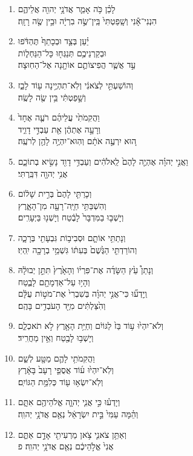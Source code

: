 \documentclass[12pt,a4paper,titlepage]{article}
\def \pscolor{red} %
\def \pslabelsep{-0.65em} %
\def \psleftmargin{0em} %
\begin{document}
\begin{hebrew}
\begin{enumerate}[leftmargin=\psleftmargin, labelsep=\pslabelsep, label=\fontspec{Linux Libertine}\arabic*, font=\color{\pscolor}\small\textsuperscript, parsep=0em, itemsep=0em, topsep=0em]
            \item לָכֵ֗ן כֹּ֥ה אָמַ֛ר אֲדֹנָ֥י יְהוִ֖ה אֲלֵיהֶ֑ם \\ הִנְנִי־אָ֕נִי וְשָֽׁפַטְתִּי֙ בֵּֽין־שֶׂ֣ה בִרְיָ֔ה וּבֵ֥ין שֶׂ֖ה רָזָֽה׃
            \item יַ֗עַן בְּצַ֤ד וּבְכָתֵף֙ תֶּהְדֹּ֔פוּ \\ וּבְקַרְנֵיכֶ֥ם תְּנַגְּח֖וּ כָּל־הַנַּחְל֑וֹת \\ עַ֣ד אֲשֶׁ֧ר הֲפִיצוֹתֶ֛ם אוֹתָ֖נָה אֶל־הַחֽוּצָה׃
            \item וְהוֹשַׁעְתִּ֣י לְצֹאנִ֔י וְלֹֽא־תִהְיֶ֥ינָה ע֖וֹד לָבַ֑ז \\ וְשָׁ֣פַטְתִּ֔י בֵּ֥ין שֶׂ֖ה לָשֶֽׂה׃
            \item וַהֲקִמֹתִ֙י עֲלֵיהֶ֜ם רֹעֶ֤ה אֶחָד֙ \\ וְרָעָ֣ה אֶתְהֶ֔ן אֵ֖ת עַבְדִּ֣י דָוִ֑יד \\ ה֚וּא יִרְעֶ֣ה אֹתָ֔ם וְהֽוּא־יִהְיֶ֥ה לָהֶ֖ן לְרֹעֶֽה׃
            \item וַאֲנִ֣י יְהוָ֗ה אֶהְיֶ֤ה לָהֶם֙ לֵֽאלֹהִ֔ים וְעַבְדִּ֥י דָוִ֖ד נָשִׂ֣יא בְתוֹכָ֑ם \\ אֲנִ֥י יְהוָ֖ה דִּבַּֽרְתִּי׃
            \item וְכָרַתִּ֤י לָהֶם֙ בְּרִ֣ית שָׁל֔וֹם \\ וְהִשְׁבַּתִּ֥י חַיָּֽה־רָעָ֖ה מִן־הָאָ֑רֶץ \\ וְיָשְׁב֤וּ בַמִּדְבָּר֙ לָבֶ֔טַח וְיָשְׁנ֖וּ בַּיְּעָרִֽים׃
            \item וְנָתַתִּ֥י אוֹתָ֛ם וּסְבִיב֥וֹת גִּבְעָתִ֖י בְּרָכָ֑ה \\ וְהוֹרַדְתִּ֤י הַגֶּ֙שֶׁם֙ בְּעִתּ֔וֹ גִּשְׁמֵ֥י בְרָכָ֖ה יִֽהְיֽוּ׃
            \item וְנָתַן֩ עֵ֙ץ הַשָּׂדֶ֜ה אֶת־פִּרְי֗וֹ וְהָאָ֙רֶץ֙ תִּתֵּ֣ן יְבוּלָ֔הּ \\ וְהָי֥וּ עַל־אַדְמָתָ֖ם לָבֶ֑טַח \\ וְֽיָדְע֞וּ כִּי־אֲנִ֣י יְהוָ֗ה בְּשִׁבְרִי֙ אֶת־מֹט֣וֹת עֻלָּ֔ם \\ וְהִ֙צַּלְתִּ֔ים מִיַּ֖ד הָעֹבְדִ֥ים בָּהֶֽם׃
            \item וְלֹא־יִהְי֙וּ ע֥וֹד בַּז֙ לַגּוֹיִ֔ם וְחַיַּ֥ת הָאָ֖רֶץ לֹ֣א תֹאכְלֵ֑ם \\ וְיָשְׁב֥וּ לָבֶ֖טַח וְאֵ֥ין מַחֲרִֽיד׃
            \item וַהֲקִמֹתִ֥י לָהֶ֛ם מַטָּ֖ע לְשֵׁ֑ם \\ וְלֹֽא־יִהְי֙וּ ע֜וֹד אֲסֻפֵ֤י רָעָב֙ בָּאָ֔רֶץ \\ וְלֹֽא־יִשְׂא֥וּ ע֖וֹד כְּלִמַּ֥ת הַגּוֹיִֽם׃
            \item וְיָדְע֗וּ כִּ֣י אֲנִ֧י יְהוָ֛ה אֱלֹהֵיהֶ֖ם אִתָּ֑ם \\ וְהֵ֗מָּה עַמִּי֙ בֵּ֣ית יִשְׂרָאֵ֔ל נְאֻ֖ם אֲדֹנָ֥י יְהוִֽה׃
            \item וְאַתֵּ֥ן צֹאנִ֛י צֹ֥אן מַרְעִיתִ֖י אָדָ֣ם אַתֶּ֑ם \\ אֲנִי֙ אֱלֹ֣הֵיכֶ֔ם נְאֻ֖ם אֲדֹנָ֥י יְהוִֽה׃ פ
      \end{enumerate}
      \newpage


\end{hebrew}
\end{document}
